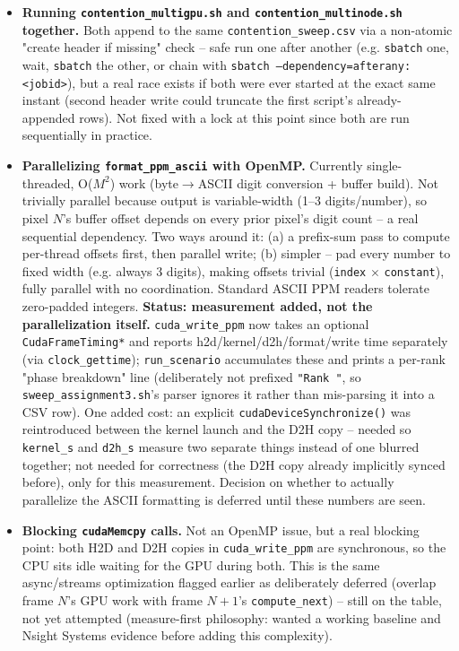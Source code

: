 \begin{itemize}
\item \textbf{Running \texttt{contention\_multigpu.sh} and \texttt{contention\_multinode.sh} together.} Both append to the same \texttt{contention\_sweep.csv} via a non-atomic "create header if missing" check -- safe run one after another (e.g. \texttt{sbatch} one, wait, \texttt{sbatch} the other, or chain with \texttt{sbatch --dependency=afterany:<jobid>}), but a real race exists if both were ever started at the exact same instant (second header write could truncate the first script's already-appended rows). Not fixed with a lock at this point since both are run sequentially in practice.
\item \textbf{Parallelizing \texttt{format\_ppm\_ascii} with OpenMP.} Currently single-threaded, O($M^2$) work (byte$\to$ASCII digit conversion + buffer build). Not trivially parallel because output is variable-width (1--3 digits/number), so pixel $N$'s buffer offset depends on every prior pixel's digit count -- a real sequential dependency. Two ways around it: (a) a prefix-sum pass to compute per-thread offsets first, then parallel write; (b) simpler -- pad every number to fixed width (e.g. always 3 digits), making offsets trivial (\texttt{index} $\times$ \texttt{constant}), fully parallel with no coordination. Standard ASCII PPM readers tolerate zero-padded integers. \textbf{Status: measurement added, not the parallelization itself.} \texttt{cuda\_write\_ppm} now takes an optional \texttt{CudaFrameTiming*} and reports h2d/kernel/d2h/format/write time separately (via \texttt{clock\_gettime}); \texttt{run\_scenario} accumulates these and prints a per-rank "phase breakdown" line (deliberately not prefixed \texttt{"Rank "}, so \texttt{sweep\_assignment3.sh}'s parser ignores it rather than mis-parsing it into a CSV row). One added cost: an explicit \texttt{cudaDeviceSynchronize()} was reintroduced between the kernel launch and the D2H copy -- needed so \texttt{kernel\_s} and \texttt{d2h\_s} measure two separate things instead of one blurred together; not needed for correctness (the D2H copy already implicitly synced before), only for this measurement. Decision on whether to actually parallelize the ASCII formatting is deferred until these numbers are seen.
\item \textbf{Blocking \texttt{cudaMemcpy} calls.} Not an OpenMP issue, but a real blocking point: both H2D and D2H copies in \texttt{cuda\_write\_ppm} are synchronous, so the CPU sits idle waiting for the GPU during both. This is the same async/streams optimization flagged earlier as deliberately deferred (overlap frame $N$'s GPU work with frame $N{+}1$'s \texttt{compute\_next}) -- still on the table, not yet attempted (measure-first philosophy: wanted a working baseline and Nsight Systems evidence before adding this complexity).

\end{itemize}
